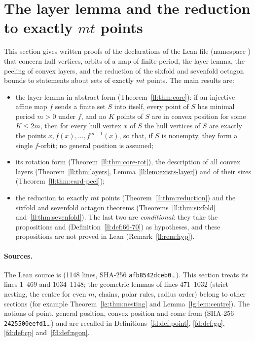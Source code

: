 \section{The layer lemma and the reduction to exactly \texorpdfstring{$mt$}{mt} points}\label{ll:sec}

This section gives written proofs of the declarations of the Lean file  (namespace
) that concern hull vertices, orbits of a map of finite period, the layer lemma, the
peeling of convex layers, and the reduction of the sixfold and sevenfold octagon bounds to statements about sets of
exactly $mt$ points. The main results are:
\begin{itemize}
\item the layer lemma in abstract form (Theorem~\ref{ll:thm:core}): if an injective affine map $f$ sends a finite set
  $S$ into itself, every point of $S$ has minimal period $m>0$ under $f$, and no $K$ points of $S$ are in convex
  position for some $K\le 2m$, then for every hull vertex $x$ of $S$ the hull vertices of $S$ are exactly the points
  $x,f(x),\dots,f^{m-1}(x)$, so that, if $S$ is nonempty, they form a single $f$-orbit; no general position is
  assumed;
\item its rotation form (Theorem~\ref{ll:thm:core-rot}), the description of all convex layers
  (Theorem~\ref{ll:thm:layers}, Lemma~\ref{ll:lem:exists-layer}) and of their sizes (Theorem~\ref{ll:thm:card-peel});
\item the reduction to exactly $mt$ points (Theorem~\ref{ll:thm:reduction}) and the sixfold and sevenfold octagon
  theorems (Theorems~\ref{ll:thm:sixfold} and~\ref{ll:thm:sevenfold}). The last two are \emph{conditional}: they take
  the propositions  and  (Definition~\ref{ll:def:66-70}) as hypotheses, and these
  propositions are not proved in Lean (Remark~\ref{ll:rem:hyp}).
\end{itemize}

\paragraph{Sources.} The Lean source is  (1148 lines, SHA-256
\texttt{afb8542dceb0}\dots). This section treats its lines 1--469 and 1034--1148; the geometric lemmas of lines
471--1032 (strict nesting, the centre for even $m$, chains, polar rules, radius order) belong to other sections (for
example Theorem~\ref{lg:thm:nesting} and Lemma~\ref{lg:lem:centre}). The notions of point, general position, convex
position and  come from  (SHA-256 \texttt{2425500eefd1}\dots)
and are recalled in Definitions~\ref{fd:def:point}, \ref{fd:def:gp}, \ref{fd:def:cp} and~\ref{fd:def:ngon}.

